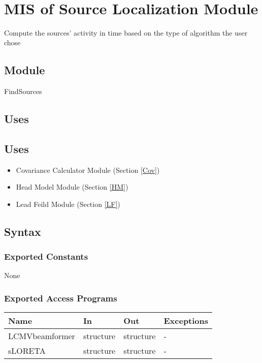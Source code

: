 \documentclass[12pt, titlepage]{article}
\begin{document}
~\newpage

\section{MIS of Source Localization Module} \label{SL} 
Compute the sources’ activity in time based on the type of algorithm the user chose

\subsection{Module}
FindSources


\subsection{Uses}
\subsection{Uses}
\begin{itemize}
\item Covariance Calculator Module (Section \ref{Cov})
\item Head Model Module (Section \ref{HM})
\item Lead Feild Module (Section \ref{LF})
\end{itemize}

\subsection{Syntax}

\subsubsection{Exported Constants}
None
\subsubsection{Exported Access Programs}

\begin{center}
\begin{tabular}{p{4cm} p{3cm} p{4cm} p{2cm}}
\hline
\textbf{Name} & \textbf{In} & \textbf{Out} & \textbf{Exceptions} \\
\hline
LCMVbeamformer & structure & structure & - \\
sLORETA & structure & structure & - \\
\hline
\end{tabular}
\end{center}
\end{document}
